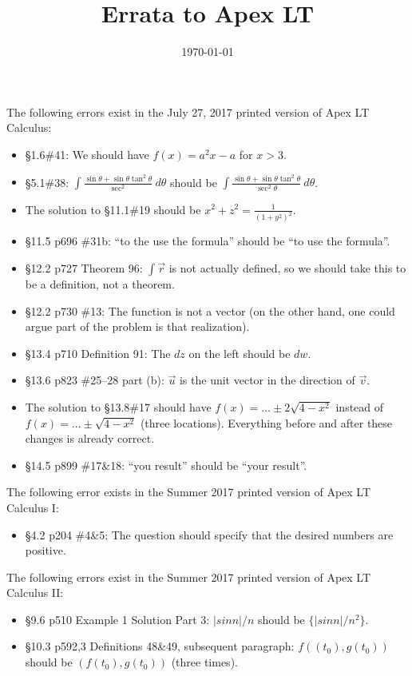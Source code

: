 \documentclass{amsart}
\title{Errata to Apex LT}
\date{\today}
\newcommand{\ds}{\displaystyle}
\begin{document}

\maketitle

The following errors exist in the July 27, 2017 printed version of Apex LT Calculus:
\begin{itemize}
\item \S1.6\#41: We should have $f(x)=a^2x-a$ for $x>3$.
\item \S5.1\#38: $\ds \int \frac{\sin\theta+\sin\theta\tan^2\theta}{\sec^2}\ d\theta$ should be $\ds \int \frac{\sin\theta+\sin\theta\tan^2\theta}{\sec^2\theta}\ d\theta$.
\item The solution to \S11.1\#19 should be $x^2+z^2=\frac1{(1+y^2)^2}$.
\item \S11.5 p696 \#31b: ``to the use the formula'' should be ``to use the formula''.
\item \S12.2 p727 Theorem 96: $\ds\int\vec r$ is not actually defined, so we should take this to be a definition, not a theorem.
\item \S12.2 p730 \#13: The function is not a vector (on the other hand, one could argue part of the problem is that realization).
\item \S13.4 p710 Definition 91: The $dz$ on the left should be $dw$.
\item \S13.6 p823 \#25--28 part (b): $\vec u$ is the unit vector in the direction of $\vec v$.
\item The solution to \S13.8\#17 should have $f(x)=\dots\pm2\sqrt{4-x^2}$ instead of $f(x)=\dots\pm\sqrt{4-x^2}$ (three locations).  Everything before and after these changes is already correct.
\item \S14.5 p899 \#17\&18: ``you result'' should be ``your result''.
\end{itemize}


\clearpage

The following error exists in the Summer 2017 printed version of Apex LT Calculus I:
\begin{itemize}
\item \S4.2 p204 \#4\&5: The question should specify that the desired numbers are positive.
\end{itemize}

The following errors exist in the Summer 2017 printed version of Apex LT Calculus II:
\begin{itemize}
\item \S9.6 p510 Example 1 Solution Part 3: $|sin n|/n$ should be $\{|sin n|/n^2\}$.
\item \S10.3 p592,3 Definitions 48\&49, subsequent paragraph: $f((t_0), g(t_0))$ should be $(f(t_0), g(t_0))$ (three times).
\end{itemize}
\end{document}
